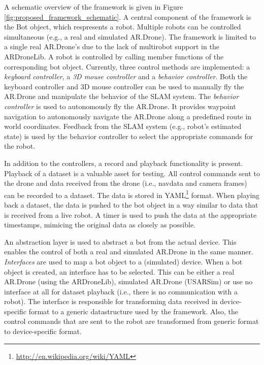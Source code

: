 A schematic overview of the framework is given in Figure \ref{fig:proposed_framework_schematic}.
A central component of the framework is the Bot object, which respresents a robot.
Multiple robots can be controlled simultaneous (e.g., a real and simulated AR.Drone).
The framework is limited to a single real AR.Drone's due to the lack of multirobot support in the ARDroneLib.
A robot is controlled by calling member functions of the corresponding bot object.
Currently, three control methods are implemented: a \textit{keyboard controller}, a \textit{3D mouse controller} and a \textit{behavior controller}.
Both the keyboard controller and 3D mouse controller can be used to manually fly the AR.Drone and manipulate the behavior of the SLAM system.
The \textit{behavior controller} is used to autonomously fly the AR.Drone. 
It provides waypoint navigation to autonomously navigate the AR.Drone along a predefined route in world coordinates.
Feedback from the SLAM system (e.g., robot's estimated state) is used by the behavior controller to select the appropriate commands for the robot.

In addition to the controllers, a record and playback functionality is present.
Playback of a dataset is a valuable asset for testing.
All control commands sent to the drone and data received from the drone (i.e., navdata and camera frames) can be recorded to a dataset.
The data is stored in YAML\footnote{\url{http://en.wikipedia.org/wiki/YAML}} format.
When playing back a dataset, the data is pushed to the bot object in a way similar to data that is received from a live robot.
A timer is used to push the data at the appropriate timestamps, mimicing the original data as closely as possible.

An abstraction layer is used to abstract a bot from the actual device.
This enables the control of both a real and simulated AR.Drone in the same manner.
\textit{Interfaces} are used to map a bot object to a (simulated) device.
When a bot object is created, an interface has to be selected.
This can be either a real AR.Drone (using the ARDroneLib), simulated AR.Drone (USARSim) or use no interface at all for dataset playback (i.e., there is no communication with a robot).
The interface is responsible for transforming data received in device-specific format to a generic datastructure used by the framework.
Also, the control commands that are sent to the robot are transformed from generic format to device-specific format.

